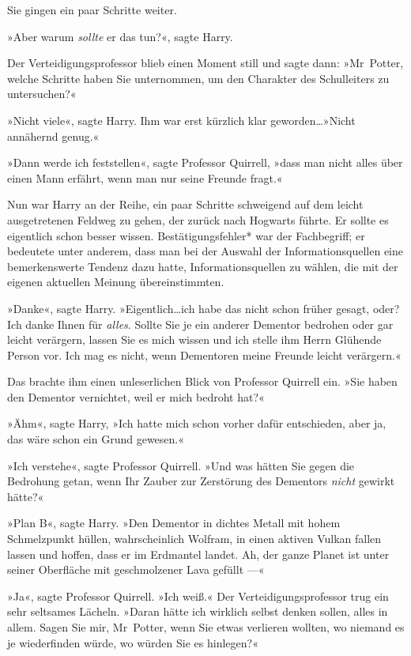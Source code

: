 {Sie gingen ein paar Schritte weiter.

»Aber warum \emph{sollte} er das tun?«, sagte Harry.

Der Verteidigungsprofessor blieb einen Moment still und sagte dann: »Mr~Potter, welche Schritte haben Sie unternommen, um den Charakter des Schulleiters zu untersuchen?«

»Nicht viele«, sagte Harry. Ihm war erst kürzlich klar geworden…»Nicht annähernd genug.«

»Dann werde ich feststellen«, sagte Professor Quirrell, »dass man nicht alles über einen Mann erfährt, wenn man nur seine Freunde fragt.«

Nun war Harry an der Reihe, ein paar Schritte schweigend auf dem leicht ausgetretenen Feldweg zu gehen, der zurück nach Hogwarts führte. Er sollte es eigentlich schon besser wissen. Bestätigungsfehler* war der Fachbegriff; er bedeutete unter anderem, dass man bei der Auswahl der Informationsquellen eine bemerkenswerte Tendenz dazu hatte, Informationsquellen zu wählen, die mit der eigenen aktuellen Meinung übereinstimmten.

»Danke«, sagte Harry. »Eigentlich…ich habe das nicht schon früher gesagt, oder? Ich danke Ihnen für \emph{alles}. Sollte Sie je ein anderer Dementor bedrohen oder gar leicht verärgern, lassen Sie es mich wissen und ich stelle ihm Herrn Glühende Person vor. Ich mag es nicht, wenn Dementoren meine Freunde leicht verärgern.«

Das brachte ihm einen unleserlichen Blick von Professor Quirrell ein. »Sie haben den Dementor vernichtet, weil er mich bedroht hat?«

»Ähm«, sagte Harry, »Ich hatte mich schon vorher dafür entschieden, aber ja, das wäre schon ein Grund gewesen.«

»Ich verstehe«, sagte Professor Quirrell. »Und was hätten Sie gegen die Bedrohung getan, wenn Ihr Zauber zur Zerstörung des Dementors \emph{nicht} gewirkt hätte?«

»Plan B«, sagte Harry. »Den Dementor in dichtes Metall mit hohem Schmelzpunkt hüllen, wahrscheinlich Wolfram, in einen aktiven Vulkan fallen lassen und hoffen, dass er im Erdmantel landet. Ah, der ganze Planet ist unter seiner Oberfläche mit geschmolzener Lava gefüllt —«

»Ja«, sagte Professor Quirrell. »Ich weiß.« Der Verteidigungsprofessor trug ein sehr seltsames Lächeln. »Daran hätte ich wirklich selbst denken sollen, alles in allem. Sagen Sie mir, Mr~Potter, wenn Sie etwas verlieren wollten, wo niemand es je wiederfinden würde, wo würden Sie es hinlegen?«

}
